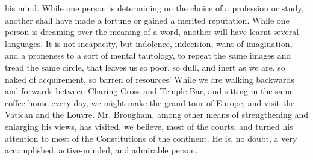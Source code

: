 his mind. While one person is determining on the choice of a
profession or study, another shall have made a fortune or gained a
merited reputation. While one person is dreaming over the meaning
of a word, another will have learnt several languages. It is not
incapacity, but indolence, indecision, want of imagination, and a
proneness to a sort of mental tautology, to repeat the same images
and tread the same circle, that leaves us so poor, so dull, and
inert as we are, so naked of acquirement, so barren of resources!
While we are walking backwards and forwards between Charing-Cross
and Temple-Bar, and sitting in the same coffee-house every day, we
might make the grand tour of Europe, and visit the Vatican and the
Louvre. Mr. Brougham, among other means of strengthening and
enlarging his views, has visited, we believe, most of the courts,
and turned his attention to most of the Constitutions of the
continent. He is, no doubt, a very accomplished, active-minded,
and admirable person.

